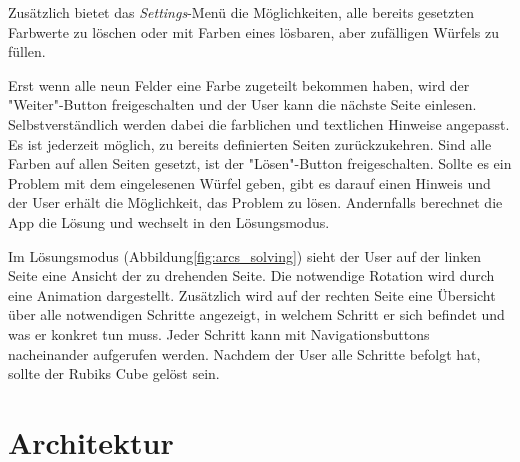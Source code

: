 Zusätzlich bietet das \emph{Settings}-Menü die Möglichkeiten, alle bereits
gesetzten Farbwerte zu löschen oder mit Farben eines lösbaren, aber zufälligen
Würfels zu füllen.

Erst wenn alle neun Felder eine Farbe zugeteilt bekommen haben, wird der
"Weiter"-Button freigeschalten und der User kann die nächste Seite einlesen.
Selbstverständlich werden dabei die farblichen und textlichen Hinweise
angepasst. Es ist jederzeit möglich, zu bereits definierten Seiten
zurückzukehren. Sind alle Farben auf allen Seiten gesetzt, ist der
"Lösen"-Button freigeschalten. Sollte es ein Problem mit dem eingelesenen Würfel
geben, gibt es darauf einen Hinweis und der User erhält die Möglichkeit, das
Problem zu lösen. Andernfalls berechnet die App die Lösung und wechselt in den
Lösungsmodus.

Im Lösungsmodus (Abbildung\ref{fig:arcs_solving}) sieht der User auf der linken
Seite eine Ansicht der zu drehenden Seite. Die notwendige Rotation wird durch
eine Animation dargestellt. Zusätzlich wird auf der rechten Seite eine Übersicht
über alle notwendigen Schritte angezeigt, in welchem Schritt er sich befindet
und was er konkret tun muss. Jeder Schritt kann mit Navigationsbuttons
nacheinander aufgerufen werden. Nachdem der User alle Schritte befolgt hat,
sollte der Rubiks Cube gelöst sein.

\section{Architektur}  %

